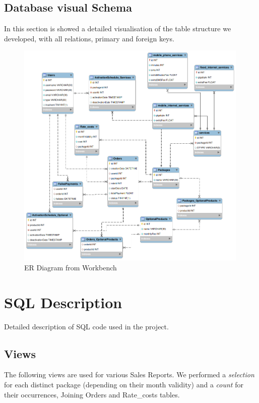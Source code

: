 \documentclass{article}
\begin{document}
\subsection{Database visual Schema}
In this section is showed a detailed visualisation of the table structure we developed, with all relations, primary and foreign keys.

\begin{figure}[hbt!]
\centering
\includegraphics[width=0.99\textwidth]{er2.png}
\caption{ER Diagram from Workbench}
\end{figure}
\newpage


\section{SQL Description}

Detailed description of SQL code used in the project.
\subsection{Views}
\label{views}
The following views are used for various Sales Reports.
We performed a \emph{selection} for each distinct package (depending on their month validity) and a \emph{count} for their occurrences, Joining Orders and Rate_costs tables.
\end{document}
